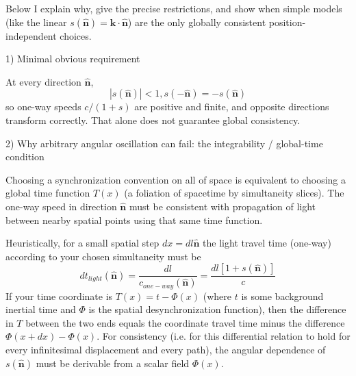 \documentclass[a4paper]{article}
\theoremstyle{plain}
\theoremstyle{definition}
\newcommand{\vect}[1]{\mathbf{#1}}
\newcommand{\hatvec}[1]{\hat{\mathbf{#1}}}
\begin{document}
Below I explain why, give the precise restrictions, and show when
simple models (like the linear
$s(\hatvec{n}) = \vect{k} \cdot \hatvec{n}$)
are the only globally consistent position-independent choices.

1) Minimal obvious requirement

At every direction $\hatvec{n}$,
\begin{equation}
|s(\hatvec{n})| < 1, s(-\hatvec{n}) = -s(\hatvec{n})
\end{equation}
so one-way speeds $c/(1+s)$ are positive and finite, and opposite
directions transform correctly.  That alone does not guarantee global
consistency.

2) Why arbitrary angular oscillation can fail: the integrability /
global-time condition

Choosing a synchronization convention on all of space is equivalent to
choosing a global time function $T(x)$ (a foliation of spacetime by
simultaneity slices).  The one-way speed in direction $\hatvec{n}$
must be consistent with propagation of light between nearby spatial
points using that same time function.

Heuristically, for a small spatial step $dx = dl \hatvec{n}$ the light
travel time (one-way) according to your chosen simultaneity must be
\begin{equation}
dt_{light}(\hatvec{n})
  = \frac{dl}{c_{one-way}(\hatvec{n})}
  = \frac{dl[1+s(\hatvec{n})]}{c}
\end{equation}
If your time coordinate is $T(x) = t-\Phi(x)$ (where $t$ is some
background inertial time and $\Phi$ is the spatial desynchronization
function), then the difference in $T$ between the two ends equals the
coordinate travel time minus the difference $\Phi(x+dx) - \Phi(x)$.
For consistency (i.e. for this differential relation to hold for every
infinitesimal displacement and every path), the angular dependence of
$s(\hatvec{n})$ must be derivable from a scalar field $\Phi(x)$.
\end{document}
